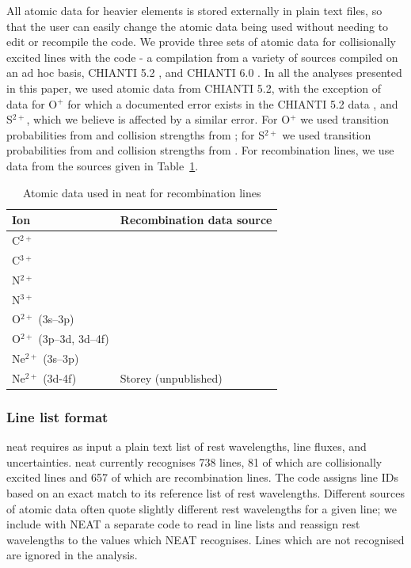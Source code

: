 \documentclass[useAMS,usenatbib]{mn2e}
\begin{document}
All atomic data for heavier elements is stored externally in plain text files, so that the user can easily change the atomic data being used without needing to edit or recompile the code.  We provide three sets of atomic data for collisionally excited lines with the code - a compilation from a variety of sources compiled on an ad hoc basis, CHIANTI 5.2 \citep{2006ApJS..162..261L}, and CHIANTI 6.0 \citep{2009A&A...498..915D}.  In all the analyses presented in this paper, we used atomic data from CHIANTI 5.2, with the exception of data for O$^{+}$ for which a documented error exists in the CHIANTI 5.2 data \citep{2009MNRAS.397..903K}, and S$^{2+}$, which we believe is affected by a similar error.  For O$^{+}$ we used transition probabilities from \citet{1982MNRAS.198..111Z} and collision strengths from \citet{1976MNRAS.177...31P}; for S$^{2+}$ we used transition probabilities from \citet{1982MNRAS.199.1025M} and collision strengths from \citet{1983IAUS..103..143M}.  For recombination lines, we use data from the sources given in Table~\ref{RL_atomic_data}.

\begin{table}
\begin{tabular}{ll}
\hline
Ion & Recombination data source \\
\hline
C$^{2+}$ & \citet{2000AAS..142...85D} \\
C$^{3+}$ & \citet{1991AA...251..680P} \\
N$^{2+}$ & \citet{1990ApJS...73..513E} \\
N$^{3+}$ & \citet{1991AA...251..680P} \\
O$^{2+}$ (3s--3p) & \citet{1994AA...282..999S} \\
O$^{2+}$ (3p--3d, 3d--4f) & \citet{1995MNRAS.272..369L} \\
Ne$^{2+}$ (3s--3p)& \citet{1998AAS..133..257K} \\
Ne$^{2+}$ (3d-4f) & Storey (unpublished) \\
\hline
\end{tabular}
\caption{Atomic data used in {\sc neat} for recombination lines}
\label{RL_atomic_data}
\end{table}

\subsubsection{Line list format}

{\sc neat} requires as input a plain text list of rest wavelengths, line fluxes, and uncertainties.  {\sc neat} currently recognises 738 lines, 81 of which are collisionally excited lines and 657 of which are recombination lines.  The code assigns line IDs based on an exact match to its reference list of rest wavelengths.  Different sources of atomic data often quote slightly different rest wavelengths for a given line; we include with {\sc NEAT} a separate code to read in line lists and reassign rest wavelengths to the values which {\sc NEAT} recognises.  Lines which are not recognised are ignored in the analysis.
\end{document}
